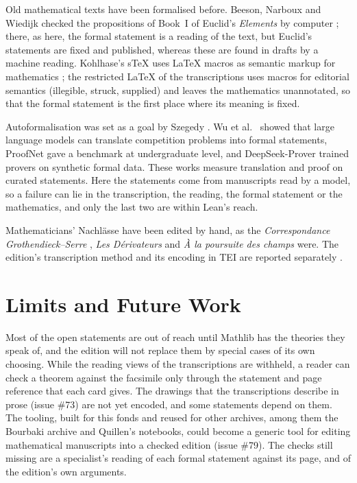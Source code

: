 \documentclass[runningheads,a4paper]{llncs}
\begin{document}
Old mathematical texts have been formalised before. Beeson, Narboux and Wiedijk checked the propositions of Book~I of Euclid's \emph{Elements} by computer \cite{beeson2019}; there, as here, the formal statement is a reading of the text, but Euclid's statements are fixed and published, whereas these are found in drafts by a machine reading. Kohlhase's s\TeX{} uses \LaTeX{} macros as semantic markup for mathematics \cite{kohlhase2008}; the restricted \LaTeX{} of the transcriptions uses macros for editorial semantics (illegible, struck, supplied) and leaves the mathematics unannotated, so that the formal statement is the first place where its meaning is fixed.

Autoformalisation was set as a goal by Szegedy \cite{szegedy2020}. Wu et al.\ \cite{wu2022} showed that large language models can translate competition problems into formal statements, ProofNet \cite{azerbayev2023} gave a benchmark at undergraduate level, and DeepSeek-Prover \cite{xin2024} trained provers on synthetic formal data. These works measure translation and proof on curated statements. Here the statements come from manuscripts read by a model, so a failure can lie in the transcription, the reading, the formal statement or the mathematics, and only the last two are within Lean's reach.

Mathematicians' Nachlässe have been edited by hand, as the \emph{Correspondance Grothendieck--Serre} \cite{colmez2001}, \emph{Les Dérivateurs} \cite{kmm} and \emph{À la poursuite des champs} \cite{maltsiniotis2022} were. The edition's transcription method and its encoding in TEI are reported separately \cite{huajtei}.

\section{Limits and Future Work}\label{sec:limits}

Most of the open statements are out of reach until Mathlib has the theories they speak of, and the edition will not replace them by special cases of its own choosing. While the reading views of the transcriptions are withheld, a reader can check a theorem against the facsimile only through the statement and page reference that each card gives. The \cntDrawings{} drawings that the transcriptions describe in prose (issue \#73) are not yet encoded, and some statements depend on them. The tooling, built for this fonds and reused for other archives, among them the Bourbaki archive and Quillen's notebooks, could become a generic tool for editing mathematical manuscripts into a checked edition (issue \#79). The checks still missing are a specialist's reading of each formal statement against its page, and of the edition's own arguments.
\end{document}
